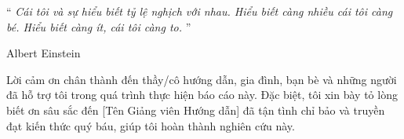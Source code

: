 \documentclass[
12pt,
oneside,
english,
doublespacing,
nolistspacing,
liststotoc,
parskip,
headsepline,
chapterinoneline,
]{HUSdissertation}
\author{Nguyễn Minh Hiếu} %
\begin{document}
	
	\lstset{style=codeC}	%
	
	\frontmatter 			%
	
	\pagestyle{plain} 
	
	
	
	
	
	
	
	
	
	\vspace*{0.2\textheight}
	
	\noindent\enquote{\itshape 
		Cái tôi và sự hiểu biết tỷ lệ nghịch với nhau. Hiểu biết càng nhiều cái tôi càng bé. Hiểu biết càng ít, cái tôi càng to.
	}\bigbreak
	
	\hfill Albert Einstein
	
	
	
	\begin{acknowledgements}
		\addchaptertocentry{\acknowledgementname}
		\thispagestyle{empty}
		Lời cảm ơn chân thành đến thầy/cô hướng dẫn, gia đình, bạn bè và những người đã hỗ trợ tôi trong quá trình thực hiện báo cáo này. Đặc biệt, tôi xin bày tỏ lòng biết ơn sâu sắc đến [Tên Giảng viên Hướng dẫn] đã tận tình chỉ bảo và truyền đạt kiến thức quý báu, giúp tôi hoàn thành nghiên cứu này.
	\end{acknowledgements}
	
	
	
	\begin{spacing}{1.15}
		\tableofcontents 	%
	\end{spacing}
	
\end{document}
